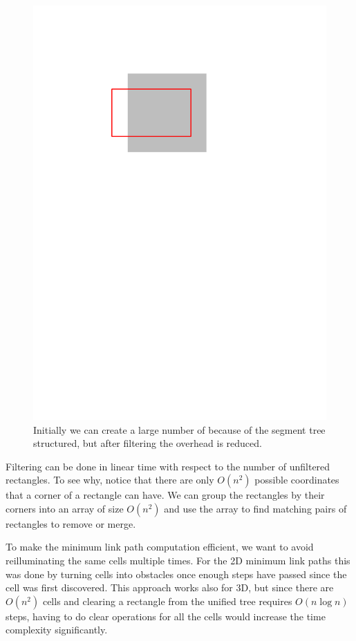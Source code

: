 \documentclass[english,gradu]{tktltiki2018}
\begin{document}
\begin{figure}
	\includegraphics[scale=0.5,page=2]{fig/filter}
	\caption{Initially we can create a large number of \addEs because of the segment tree structured, but after filtering the overhead is reduced.}\label{fig:filter}
\end{figure}

Filtering can be done in linear time with respect to the number of unfiltered rectangles.
To see why, notice that there are only $O(n^2)$ possible coordinates that a corner of a rectangle can have.
We can group the rectangles by their corners into an array of size $O(n^2)$ and use the array to find matching pairs of rectangles to remove or merge.

To make the minimum link path computation efficient, we want to avoid reilluminating the same cells multiple times.
For the 2D minimum link paths this was done by turning cells into obstacles once enough steps have passed since the cell was first discovered.
This approach works also for 3D, but since there are $O(n^2)$ cells and clearing a rectangle from the unified tree requires $O(n\log n)$ steps, having to do clear operations for all the cells would increase the time complexity significantly.
\end{document}
